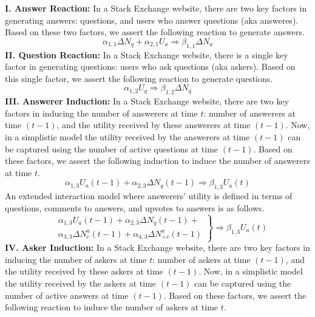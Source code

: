 \textbf{I. Answer Reaction:} In a Stack Exchange website, there are two key factors in generating answers: questions, and users who answer questions (aka answeres). Based on these two factors, we assert the following reaction to generate answers.
\begin{equation*}
\alpha_{1, 1} \Delta N_q + \alpha_{2, 1} U_a \Longrightarrow \beta_{1, 1} \Delta N_a
\end{equation*}
\indent \textbf{II. Question Reaction:} In a Stack Exchange website, there is a single key factor in generating questions: users who ask questions (aka askers). Based on this single factor, we assert the following reaction to generate questions.
\begin{equation*}
\alpha_{1, 2} U_q \Longrightarrow \beta_{1, 2} \Delta N_q
\end{equation*}
\indent \textbf{III. Answerer Induction:} In a Stack Exchange website, there are two key factors in inducing the number of answerers at time $t$: number of answerers at time $(t-1)$, and the utility received by these answerers at time $(t-1)$. Now, in a simplistic model the utility received by the answerers at time $(t-1)$ can be captured using the number of active questions at time $(t-1)$. Based on these factors, we assert the following induction to induce the number of answerers at time $t$.
\begin{equation*}
\alpha_{1, 3} U_a(t-1) + \alpha_{2, 3} \Delta N_q(t-1) \Longrightarrow \beta_{1, 3} U_a(t)
\end{equation*} 
\noindent An extended interaction model where answerers' utility is defined in terms of questions, comments to answers, and upvotes to answers is as follows.
\begin{equation*}
\left.
\begin{aligned}
& \alpha_{1, 3} U_a(t-1) + \alpha_{2, 3} \Delta N_q(t-1) +\\
& \alpha_{3, 3} \Delta N_c^a(t-1) + \alpha_{4, 3} \Delta N_{+v}^a(t-1)
\end{aligned}
\right\}
\Longrightarrow \beta_{1, 3} U_a(t)
\end{equation*}
\indent \textbf{IV. Asker Induction:} In a Stack Exchange website, there are two key factors in inducing the number of askers at time $t$: number of askers at time $(t-1)$, and the utility received by these askers at time $(t-1)$. Now, in a simplistic model the utility received by the askers at time $(t-1)$ can be captured using the number of active answers at time $(t-1)$. Based on these factors, we assert the following reaction to induce the number of askers at time $t$. 
